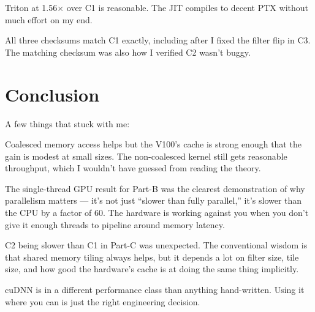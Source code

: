 \documentclass[11pt,letterpaper]{article}
\begin{document}
Triton at 1.56$\times$ over C1 is reasonable. The JIT compiles to decent PTX
without much effort on my end.

All three checksums match C1 exactly, including after I fixed the filter flip in
C3. The matching checksum was also how I verified C2 wasn't buggy.

\section{Conclusion}

A few things that stuck with me:

Coalesced memory access helps but the V100's cache is strong enough that the gain
is modest at small sizes. The non-coalesced kernel still gets reasonable throughput,
which I wouldn't have guessed from reading the theory.

The single-thread GPU result for Part-B was the clearest demonstration of why
parallelism matters --- it's not just ``slower than fully parallel,'' it's slower
than the CPU by a factor of 60. The hardware is working against you when you don't
give it enough threads to pipeline around memory latency.

C2 being slower than C1 in Part-C was unexpected. The conventional wisdom is that
shared memory tiling always helps, but it depends a lot on filter size, tile size,
and how good the hardware's cache is at doing the same thing implicitly.

cuDNN is in a different performance class than anything hand-written. Using it where
you can is just the right engineering decision.
\end{document}
